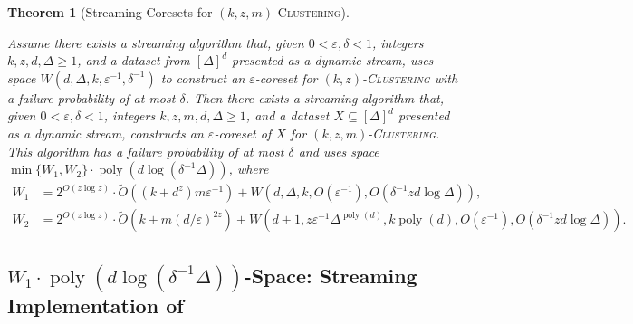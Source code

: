 \documentclass[letterpaper,11pt]{article}
\theoremstyle{plain}
\newtheorem{theorem}{Theorem}[section]
\theoremstyle{definition}
\theoremstyle{remark}
\DeclareMathOperator{\poly}{poly}
\newcommand{\eps}{\varepsilon}
\newcommand{\ProblemName}[1]{\textsc{#1}}
\newcommand{\kzC}{\ProblemName{$(k,z)$-Clustering}\xspace}
\newcommand{\kzmC}{\ProblemName{$(k,z,m)$-Clustering}\xspace}
\begin{document}
\begin{theorem}[Streaming Coresets for \kzmC]
    \label{thm:dynamic coresets}

    Assume there exists a streaming algorithm that, given $0< \eps,\delta < 1$, integers $k, z, d, \Delta \geq 1$, and a dataset from $[\Delta]^d$ presented as a dynamic stream, uses space $W(d,\Delta, k, \eps^{-1},\delta^{-1})$ to construct an $\eps$-coreset for \kzC with a failure probability of at most $\delta$.
Then there exists a streaming algorithm that, given $0< \eps,\delta < 1$, integers $k,z,m,d,\Delta\ge 1$, and a dataset $X\subseteq [\Delta]^d$ presented as a dynamic stream, constructs an $\eps$-coreset of $X$ for \kzmC. This algorithm has a failure probability of at most $\delta$ and uses space $\min\{W_1,W_2\}\cdot \poly(d\log(\delta^{-1}\Delta))$, where 
    \begin{equation*}   
        \begin{aligned}
        W_1 &= 2^{O(z\log z)}\cdot \tilde O\left((k+d^z)m\eps^{-1}\right)+ W\left(d,\Delta,k,O(\eps^{-1}),O(\delta^{-1}zd\log\Delta)\right),\\
        W_2 &= 2^{O(z\log z)}\cdot \tilde O\left(k + m(d/\eps)^{2z}\right) + W\left(d+1, z\eps^{-1}\Delta^{\poly(d)}, k\poly(d), O(\eps^{-1}),O(\delta^{-1}zd\log\Delta)\right).
        \end{aligned}
    \end{equation*}
\end{theorem}










      \subsection{$W_1\cdot\poly(d\log(\delta^{-1}\Delta))$-Space: Streaming Implementation of~}
\label{sec:streaming coreset}
\end{document}
